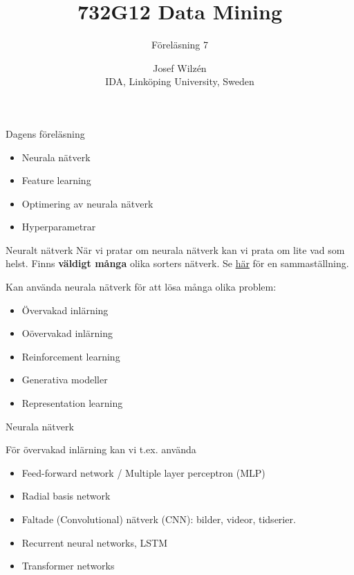 \documentclass[10pt,english]{beamer}
\title{732G12 Data Mining}
\subtitle{Föreläsning 7}
\date{}
\author{Josef Wilzén \\ IDA, Linköping University, Sweden}
\begin{document}
\maketitle

\begin{frame}{Dagens föreläsning}

    \begin{itemize}
        \item Neurala nätverk
        \item Feature learning
        \item Optimering av neurala nätverk
        \item Hyperparametrar
    \end{itemize}
    
\end{frame}


\begin{frame}{Neuralt nätverk}
    När vi pratar om neurala nätverk kan vi prata om lite vad som helst. Finns \textbf{väldigt många} olika sorters nätverk. Se \href{https://www.asimovinstitute.org/neural-network-zoo/}{här} för en sammaställning.

    Kan använda neurala nätverk för att lösa många olika problem:
    \begin{itemize}
        \item Övervakad inlärning
        \item Oövervakad inlärning
        \item Reinforcement learning
        \item Generativa modeller
        \item Representation learning
    \end{itemize}

\end{frame}


\begin{frame}{Neurala nätverk}
    
    För övervakad inlärning kan vi t.ex. använda
    \begin{itemize}
        \item Feed-forward network / Multiple layer perceptron (MLP)
        \item Radial basis network
        \item Faltade (Convolutional) nätverk (CNN): bilder, videor, tidserier.
        \item Recurrent neural networks, LSTM
        \item Transformer networks 
    \end{itemize}

\end{frame}
\end{document}
